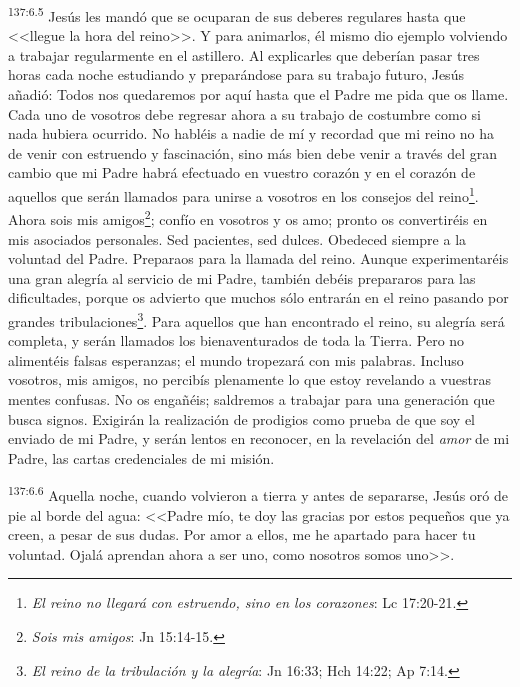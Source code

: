 \par 
\textsuperscript{137:6.5} Jesús les mandó que se ocuparan de sus deberes regulares hasta que <<llegue la hora del reino>>. Y para animarlos, él mismo dio ejemplo volviendo a trabajar regularmente en el astillero. Al explicarles que deberían pasar tres horas cada noche estudiando y preparándose para su trabajo futuro, Jesús añadió: \guillemotleft Todos nos quedaremos por aquí hasta que el Padre me pida que os llame. Cada uno de vosotros debe regresar ahora a su trabajo de costumbre como si nada hubiera ocurrido. No habléis a nadie de mí y recordad que mi reino no ha de venir con estruendo y fascinación, sino más bien debe venir a través del gran cambio que mi Padre habrá efectuado en vuestro corazón y en el corazón de aquellos que serán llamados para unirse a vosotros en los consejos del reino\footnote{\textit{El reino no llegará con estruendo, sino en los corazones}: Lc 17:20-21.}. Ahora sois mis amigos\footnote{\textit{Sois mis amigos}: Jn 15:14-15.}; confío en vosotros y os amo; pronto os convertiréis en mis asociados personales. Sed pacientes, sed dulces. Obedeced siempre a la voluntad del Padre. Preparaos para la llamada del reino. Aunque experimentaréis una gran alegría al servicio de mi Padre, también debéis prepararos para las dificultades, porque os advierto que muchos sólo entrarán en el reino pasando por grandes tribulaciones\footnote{\textit{El reino de la tribulación y la alegría}: Jn 16:33; Hch 14:22; Ap 7:14.}. Para aquellos que han encontrado el reino, su alegría será completa, y serán llamados los bienaventurados de toda la Tierra. Pero no alimentéis falsas esperanzas; el mundo tropezará con mis palabras. Incluso vosotros, mis amigos, no percibís plenamente lo que estoy revelando a vuestras mentes confusas. No os engañéis; saldremos a trabajar para una generación que busca signos. Exigirán la realización de prodigios como prueba de que soy el enviado de mi Padre, y serán lentos en reconocer, en la revelación del \textit{amor} de mi Padre, las cartas credenciales de mi misión\guillemotright.

\par 
\textsuperscript{137:6.6} Aquella noche, cuando volvieron a tierra y antes de separarse, Jesús oró de pie al borde del agua: <<Padre mío, te doy las gracias por estos pequeños que ya creen, a pesar de sus dudas. Por amor a ellos, me he apartado para hacer tu voluntad. Ojalá aprendan ahora a ser uno, como nosotros somos uno>>.

